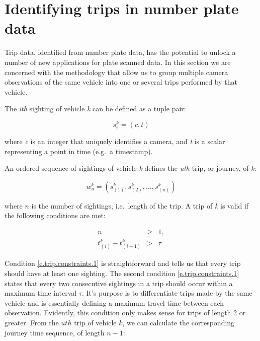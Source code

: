 \section{Identifying trips in number plate data}

Trip data, identified from number plate data, has the potential to unlock a number of new applications for plate scanned data. In this section we are concerned with the methodology that allow us to group multiple camera observations of the same vehicle into one or several trips performed by that vehicle.

The \emph{ith} sighting of vehicle \emph{k} can be defined as a tuple pair:

\begin{equation} \label{e.sighting}
s^{k}_{i} = \left(c, t\right)
\end{equation}

where \emph{c} is an integer that uniquely identifies a camera, and \emph{t} is a scalar representing a point in time (e.g.\ a timestamp).

An ordered sequence of sightings of vehicle \emph{k} defines the \emph{uth} trip, or journey, of \emph{k}:

\begin{equation} \label{e.trip}
w^{k}_{u} = \left(s^{k}_{(1)}, s^{k}_{(2)}, \dots , s^{k}_{(n)}\right)
\end{equation}

where \( n \) is the number of sightings, i.e.\ length of the trip. A trip of \emph{k} is valid if the following conditions are met:

\begin{eqnarray}
n &\ge& 1 , \\ \label{e.trip.constraints.1}
t_{(i)}^{k} - t_{(i-1)}^{k} &>& \tau \label{e.trip.constraints.2}
\end{eqnarray}

Condition \ref{e.trip.constraints.1} is straightforward and tells us that every trip should have at least one sighting. The second condition \ref{e.trip.constraints.1} states that every two consecutive sightings in a trip should occur within a maximum time interval $\tau$. It's purpose is to differentiate trips made by the same vehicle and is essentially defining a maximum travel time between each observation. Evidently, this condition only makes sense for trips of length 2 or greater. From the \( uth \) trip of vehicle \( k \), we can calculate the corresponding journey time sequence, of length \(n-1\):

